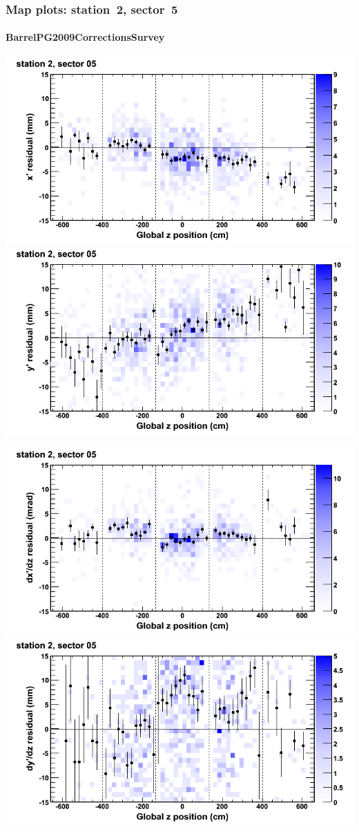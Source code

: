 \documentclass[compress]{beamer}
\begin{document}
\begin{frame}
\frametitle{Map plots: station~2, sector~5}
\framesubtitle{BarrelPG2009CorrectionsSurvey}
\includegraphics[width=0.5\linewidth]{mapplots_01/DTvsz_st2sec05_x.png}
\includegraphics[width=0.5\linewidth]{mapplots_01/DTvsz_st2sec05_y.png}

\includegraphics[width=0.5\linewidth]{mapplots_01/DTvsz_st2sec05_dxdz.png}
\includegraphics[width=0.5\linewidth]{mapplots_01/DTvsz_st2sec05_dydz.png}
\end{frame}
\end{document}
